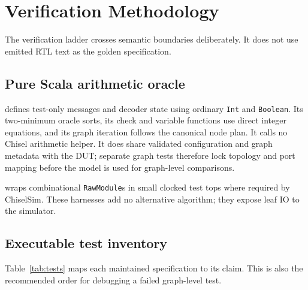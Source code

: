 \documentclass[10pt,conference]{IEEEtran}
\begin{document}
\section{Verification Methodology}
The verification ladder crosses semantic boundaries deliberately.  It does not
use emitted RTL text as the golden specification.

\subsection{Pure Scala arithmetic oracle}
 defines test-only messages and decoder state using
ordinary \texttt{Int} and \texttt{Boolean}.  Its two-minimum oracle sorts, its
check and variable functions use direct integer equations, and its graph
iteration follows the canonical node plan.  It calls no Chisel arithmetic
helper.  It does share validated configuration and graph metadata with the DUT;
separate graph tests therefore lock topology and port mapping before the model
is used for graph-level comparisons.

 wraps combinational \texttt{RawModule}s in small clocked
test tops where required by ChiselSim.  These harnesses add no alternative
algorithm; they expose leaf IO to the simulator.

\subsection{Executable test inventory}
Table~\ref{tab:tests} maps each maintained specification to its claim.  This is
also the recommended order for debugging a failed graph-level test.
\end{document}
